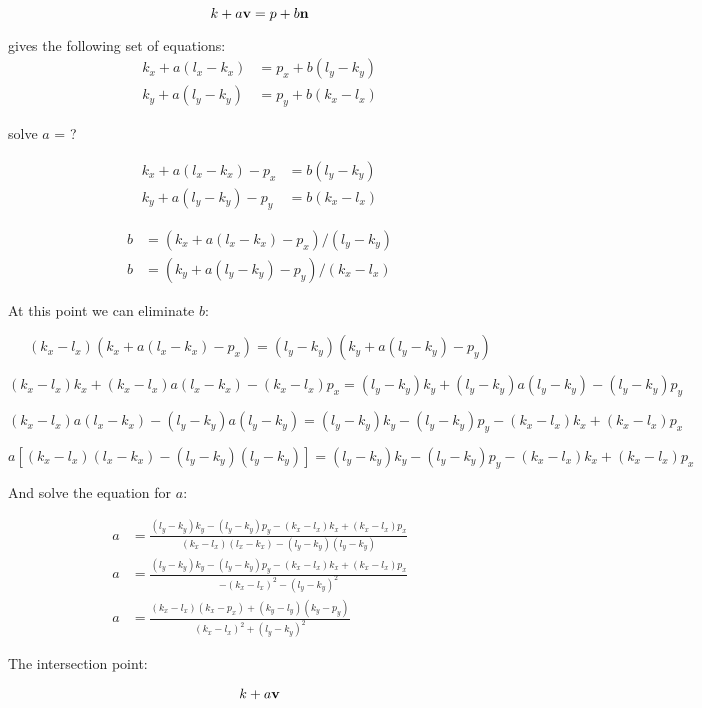 \documentclass[a4paper,12pt]{article}
\begin{document}
\[k + a\vb{v} = p + b\vb{n}\]

gives the following set of equations:
\begin{align*}
  k_x + a (l_x - k_x) &= p_x + b (l_y - k_y)\\
  k_y + a (l_y - k_y) &= p_y + b (k_x - l_x)
\end{align*}

solve \(a\) = ?

\begin{align*}
  k_x + a (l_x - k_x) - p_x &= b (l_y - k_y)\\
  k_y + a (l_y - k_y) - p_y &= b (k_x - l_x)
\end{align*}

\begin{align*}
  b &= (k_x + a (l_x - k_x) - p_x) / (l_y - k_y)\\
  b &= (k_y + a (l_y - k_y) - p_y) / (k_x - l_x)
\end{align*}

At this point we can eliminate \(b\):

\[(k_x - l_x) (k_x + a (l_x - k_x) - p_x) = (l_y - k_y) (k_y + a (l_y - k_y) - p_y)\]

\[(k_x - l_x) k_x + (k_x - l_x) a (l_x - k_x) - (k_x - l_x) p_x = (l_y - k_y) k_y + (l_y - k_y) a (l_y - k_y) - (l_y - k_y) p_y\]

\[(k_x - l_x) a (l_x - k_x) - (l_y - k_y) a (l_y - k_y) = (l_y - k_y) k_y - (l_y - k_y) p_y - (k_x - l_x) k_x + (k_x - l_x) p_x\]

\[a [(k_x - l_x) (l_x - k_x) - (l_y - k_y) (l_y - k_y)] = (l_y - k_y) k_y - (l_y - k_y) p_y - (k_x - l_x) k_x + (k_x - l_x) p_x\]

And solve the equation for \(a\):

\begin{align*}
  a &= \frac{(l_y - k_y)k_y - (l_y - k_y)p_y - (k_x - l_x)k_x + (k_x - l_x)p_x}{(k_x - l_x)(l_x - k_x) - (l_y - k_y)(l_y - k_y)}\\
  a &= \frac{(l_y - k_y)k_y - (l_y - k_y)p_y - (k_x - l_x)k_x + (k_x - l_x)p_x}{- (k_x - l_x)^2 - (l_y - k_y)^2}\\
  a &= \frac{(k_x - l_x)(k_x - p_x) + (k_y - l_y)(k_y - p_y)}{(k_x - l_x)^2 + (l_y - k_y)^2}
\end{align*}

The intersection point:

\[k + a\vb{v}\]
\end{document}
